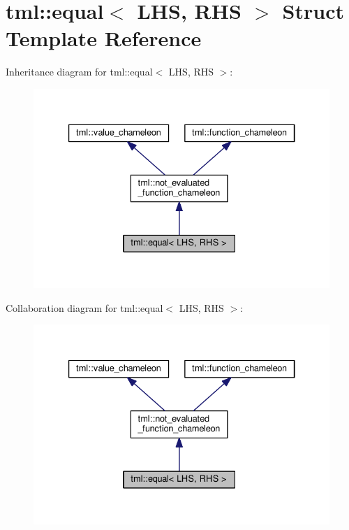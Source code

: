\hypertarget{structtml_1_1equal}{\section{tml\+:\+:equal$<$ L\+H\+S, R\+H\+S $>$ Struct Template Reference}
\label{structtml_1_1equal}
}


Inheritance diagram for tml\+:\+:equal$<$ L\+H\+S, R\+H\+S $>$\+:
\nopagebreak
\begin{figure}[H]
\begin{center}
\leavevmode
\includegraphics[width=333pt]{structtml_1_1equal__inherit__graph}
\end{center}
\end{figure}


Collaboration diagram for tml\+:\+:equal$<$ L\+H\+S, R\+H\+S $>$\+:
\nopagebreak
\begin{figure}[H]
\begin{center}
\leavevmode
\includegraphics[width=333pt]{structtml_1_1equal__coll__graph}
\end{center}
\end{figure}
